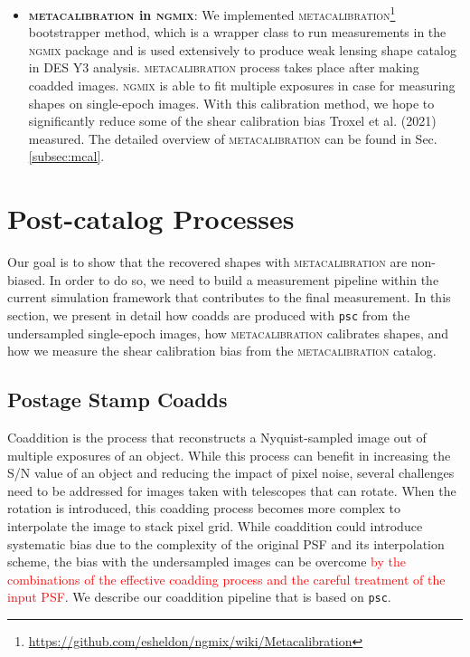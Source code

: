 \documentclass[fleqn,usenatbib]{mnras}
\begin{document}
\begin{itemize}
    \item \textbf{\textsc{metacalibration} in \textsc{ngmix}}: We implemented \textsc{metacalibration}\footnote{\url{https://github.com/esheldon/ngmix/wiki/Metacalibration}} bootstrapper method, which is a wrapper class to run measurements in the \textsc{ngmix} package and is used extensively to produce weak lensing shape catalog in DES Y3 analysis. \textsc{metacalibration} process takes place after making coadded images. \textsc{ngmix} is able to fit multiple exposures in case for measuring shapes on single-epoch images. With this calibration method, we hope to significantly reduce some of the shear calibration bias Troxel et al. (2021) measured. The detailed overview of \textsc{metacalibration} can be found in Sec.\ref{subsec:mcal}. 
\end{itemize}



\section{Post-catalog Processes}
\label{sec:methods}
Our goal is to show that the recovered shapes with \textsc{metacalibration} are non-biased. In order to do so, we need to build a measurement pipeline within the current simulation framework that contributes to the final measurement. In this section, we present in detail how coadds are produced with \texttt{psc} from the undersampled single-epoch images, how \textsc{metacalibration} calibrates shapes, and how we measure the shear calibration bias from the \textsc{metacalibration} catalog. 


\subsection{Postage Stamp Coadds}
\label{subsec:psc}
Coaddition is the process that reconstructs a Nyquist-sampled image out of multiple exposures of an object. While this process can benefit in increasing the S/N value of an object and reducing the impact of pixel noise, several challenges need to be addressed for images taken with telescopes that can rotate. When the rotation is introduced, this coadding process becomes more complex to interpolate the image to stack pixel grid. While coaddition could introduce systematic bias due to the complexity of the original PSF and its interpolation scheme, the bias with the undersampled images can be overcome \textcolor{red}{by the combinations of the effective coadding process and the careful treatment of the input PSF}. We describe our coaddition pipeline that is based on \texttt{psc}.
\end{document}
